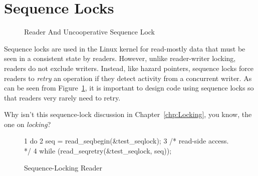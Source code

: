 
\section{Sequence Locks}
\label{sec:defer:Sequence Locks}

\begin{figure}[tb]
\centering
{}
\caption{Reader And Uncooperative Sequence Lock}
\label{fig:defer:Reader And Uncooperative Sequence Lock}
\end{figure}

Sequence locks are used in the Linux kernel for read-mostly data that
must be seen in a consistent state by readers.
However, unlike reader-writer locking, readers do not exclude writers.
Instead, like hazard pointers, sequence locks force readers to
\emph{retry} an operation if they detect activity from a concurrent writer.
As can be seen from
Figure~\ref{fig:defer:Reader And Uncooperative Sequence Lock},
it is important to design code using sequence locks so that readers
very rarely need to retry.

\QuickQuiz{}
	Why isn't this sequence-lock discussion in Chapter~\ref{chp:Locking},
	you know, the one on \emph{locking}?
 \QuickQuizEnd

\begin{figure}[bp]
{ \scriptsize
\begin{verbbox}
  1 do {
  2   seq = read_seqbegin(&test_seqlock);
  3   /* read-side access. */
  4 } while (read_seqretry(&test_seqlock, seq));
\end{verbbox}
}
\centering
\theverbbox
\caption{Sequence-Locking Reader}
\label{fig:defer:Sequence-Locking Reader}
\end{figure}


